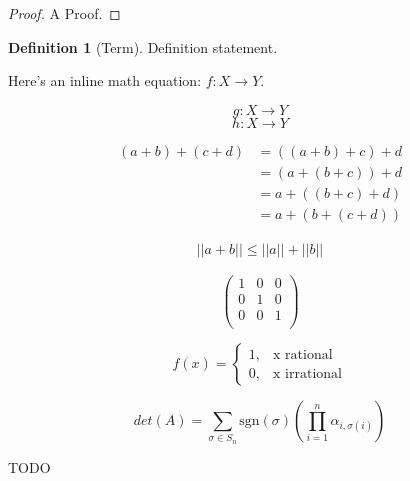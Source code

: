\documentclass[11pt, reqno]{amsart}
\theoremstyle{plain}
\theoremstyle{definition}
\newtheorem*{defn}{Definition}
\theoremstyle{example}
\begin{document}
\begin{proof}
	A Proof.
\end{proof}

\begin{defn}[Term]
	Definition statement.
\end{defn}



Here's an inline math equation: $f: X \rightarrow Y$. 

$$g: X \rightarrow Y$$
\[h: X \rightarrow Y\]

\begin{align*}
  (a + b) + (c + d) &= ((a + b) + c) + d \\
  &= (a + (b + c)) + d \\ 
  &= a + ((b + c) + d) \\ 
  &= a + (b + (c + d)) 
\end{align*}

\begin{align}
	||a+b|| \leq ||a|| + ||b||
\end{align}

\[\begin{pmatrix}
	1 & 0 & 0 \\ 
	0 & 1 & 0 \\ 
	0 & 0 & 1 \\
\end{pmatrix}\]

\[ f(x) = 
\begin{cases} 
	1, &\text{x rational } \\
	0, &\text{x irrational}	
\end{cases}
\]

\[det(A) = \sum_{\sigma \in S_n}\text{sgn}(\sigma)\left(\prod_{i=1}^n \alpha_{i, \sigma(i)}\right)\]

TODO

\end{document}
